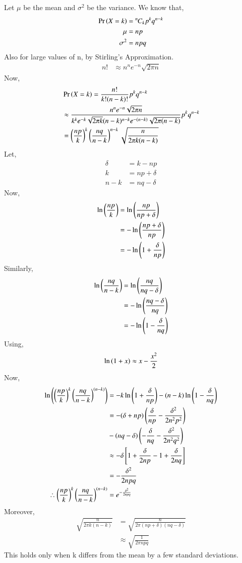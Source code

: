 \documentclass[journal,12pt,twocolumn]{IEEEtran}
\newcommand{\permcomb}[4][0mu]{{{}^{#3}\mkern#1#2_{#4}}}
\newcommand{\comb}[1][-1mu]{\permcomb[#1]{C}}
\begin{document}
Let $\mu$ be the mean and $\sigma^2$ be the variance.
We know that,
\begin{align}
    \pr{X=k} &= \comb{n}{k}p^kq^{n-k}\\
    \mu &= np\\
    \sigma^2 &= npq
\end{align}
Also for large values of n, by Stirling's Approximation.
\begin{align}
    n! &\approx n^n e^{-n} \sqrt{2\pi n}
\end{align}
Now,
\begin{align}
    &\Pr\left(X = k\right) = \frac{n!}{k!(n-k)!}p^kq^{n-k}\\
    &\approx \frac{n^n e^{-n} \sqrt{2\pi n}}{k^k e^{-k} \sqrt{2\pi k} (n-k)^{n-k} e^{-(n-k)} \sqrt{2\pi (n-k)}} p^k q^{n-k}\\
    &= \left(\frac{np}{k}\right)^k \left(\frac{nq}{n-k}\right)^{n-k} \sqrt{\frac{n}{2\pi k(n-k)}}
\end{align}
Let,
\begin{align}
    \delta &= k - np\\  
    k &= np + \delta\\
    n-k &= nq -\delta
\end{align}
Now,
\begin{align}
    \ln{\ensuremath{\left(\frac{np}{k}\right)}}&= \ln{\ensuremath{\left(\frac{np}{np+\delta}\right)}}\\
    &= -\ln{\ensuremath{\left(\frac{np+\delta}{np}\right)}}\\
    &= -\ln{\ensuremath{\left(1+\frac{\delta}{np}\right)}}
\end{align}
Similarly,
\begin{align}
    \ln{\ensuremath{\left(\frac{nq}{n-k}\right)}}&= \ln{\ensuremath{\left(\frac{nq}{nq-\delta}\right)}}\\
    &= -\ln{\ensuremath{\left(\frac{nq-\delta}{nq}\right)}}\\
    &= -\ln{\ensuremath{\left(1-\frac{\delta}{nq}\right)}}
\end{align}
Using,
\begin{align}
    \ln{\ensuremath{\left(1+x\right)}} \approx x-\frac{x^2}{2}
\end{align}
Now,
\begin{align}
    \ln{\ensuremath{\left(\left(\frac{np}{k}\right)^k \left(\frac{nq}{n-k}\right)^{(n-k)}\right)}}&=-k\ln{\ensuremath{\left(1+\frac{\delta}{np}\right)}}-(n-k)\ln{\ensuremath{\left(1-\frac{\delta}{nq}\right)}}\\
    &=-(\delta + np)\left(\frac{\delta}{np}-\frac{\delta^2}{2n^2 p^2}\right)\nonumber\\
    &-(nq-\delta)\left(-\frac{\delta}{nq}-\frac{\delta^2}{2n^2q^2}\right)\\
    &\approx -\delta {}\left[1+\frac{\delta}{2np}-1+\frac{\delta}{2nq}\right]\\
    &= - \frac{\delta^2}{2npq}\\
    \therefore \left(\frac{np}{k}\right)^k \left(\frac{nq}{n-k}\right)^{(n-k)}&=e^{-\frac{\delta^2}{2npq}}
\end{align}
Moreover,
\begin{align}
    \sqrt{\frac{n}{2\pi k(n-k)}} &= \sqrt{\frac{n}{2\pi (np+\delta)(nq-\delta)}}\\
    &\approx \sqrt{\frac{1}{2\pi npq}}
\end{align}
This holds only when k differs from the mean by a few standard deviations.
\end{document}
